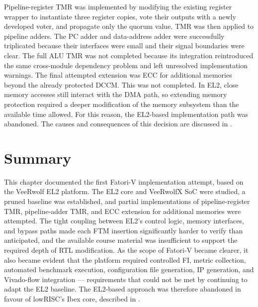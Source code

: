 Pipeline-register \ac{TMR} was implemented by modifying the existing register wrapper to instantiate three register copies, vote their outputs with a newly developed voter, and propagate only the quorum value. \ac{TMR} was then applied to pipeline adders. The \ac{PC} adder and data-address adder were successfully triplicated because their interfaces were small and their signal boundaries were clear. The full \ac{ALU} \ac{TMR} was not completed because its integration reintroduced the same cross-module dependency problem and left unresolved implementation warnings. The final attempted extension was \ac{ECC} for additional memories beyond the already protected \ac{DCCM}. This was not completed. In EL2, close memory accesses still interact with the \ac{DMA} path, so extending memory protection required a deeper modification of the memory subsystem than the available time allowed. For this reason, the EL2-based implementation path was abandoned. The causes and consequences of this decision are discussed in .



\section{Summary}
\label{chap4:summary}

This chapter documented the first Fatori-V implementation attempt, based on the VeeRwolf EL2 platform. The EL2 core and VeeRwolfX \ac{SoC} were studied, a pruned baseline was established, and partial implementations of pipeline-register \ac{TMR}, pipeline-adder \ac{TMR}, and \ac{ECC} extension for additional memories were attempted. The tight coupling between EL2's control logic, memory interfaces, and bypass paths made each \ac{FTM} insertion significantly harder to verify than anticipated, and the available course material was insufficient to support the required depth of \ac{RTL} modification. As the scope of \ac{Fatori-V} became clearer, it also became evident that the platform required controlled \ac{FI}, metric collection, automated benchmark execution, configuration file generation, \ac{IP} generation, and Vivado-flow integration — requirements that could not be met by continuing to adapt the EL2 baseline. The EL2-based approach was therefore abandoned in favour of lowRISC's Ibex core, described in .
